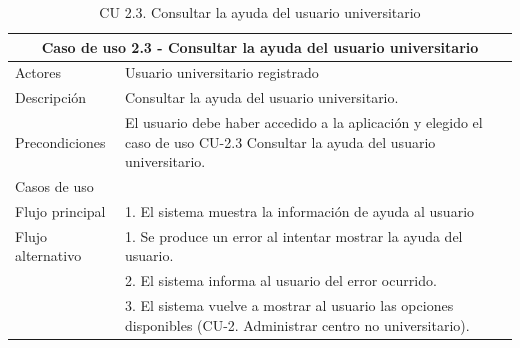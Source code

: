 \begin{table}[H]
\caption{CU 2.3. Consultar la ayuda del usuario universitario}        \label{tab:CU-2.3}
        \begin{center}
            \begin{tabular}{|l|p{12cm}|}
                \hline
                \multicolumn{2}{|c|}{Caso de uso 2.3 -  Consultar la ayuda del usuario universitario} \\
                \hline \hline
                Actores                 &   Usuario universitario registrado          \\  
                \hline
                Descripción             &   Consultar la ayuda del usuario universitario. \\  \hline
                Precondiciones          &  El usuario debe haber accedido a la aplicación y elegido el caso de uso CU-2.3 Consultar la ayuda del usuario universitario. \\  
                \hline
                Casos de uso            &           \\  
                \hline
                Flujo principal         &   1. El sistema muestra la información de ayuda al usuario  \\ 
                \hline
                Flujo alternativo    &   1. Se produce un error al intentar mostrar la ayuda del usuario. \\
                & 2. El sistema informa al usuario del error ocurrido. \\
                & 3. El sistema vuelve a mostrar al usuario las opciones disponibles (CU-2. Administrar centro no universitario).  \\
                \hline
            \end{tabular}
        \end{center}
    \end{table}
\newpage


